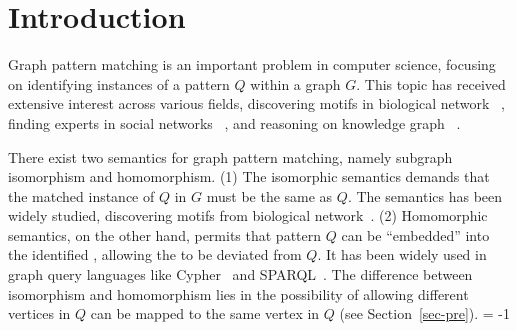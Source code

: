 %
\section{Introduction}
\label{sec-intro}
Graph pattern matching is 
an important problem in computer 
science, focusing on identifying instances of a pattern $Q$ 
within a graph $G$.
This topic has received 
extensive interest across various fields,
\eg 
discovering motifs in biological network
~\cite{chen2019hogmmnc, licheri2021grapes, tian2007saga}, 
finding experts in social networks
~\cite{shi2017multi, fei2013expfinder, brynielsson2010detecting}, 
and reasoning on knowledge graph
~\cite{xu2019cross, teru2020inductive, li2022hismatch}.

There exist two semantics for graph pattern matching, 
namely subgraph isomorphism and homomorphism.
(1) The isomorphic semantics demands that
the matched instance of $Q$  in 
$G$  must be the same as $Q$.
The semantics has been widely studied, 
\eg discovering motifs from biological network~\cite{chen2019hogmmnc, licheri2021grapes, tian2007saga}.
(2) Homomorphic semantics,
on the other hand, permits that 
pattern $Q$ can be ``embedded'' into the 
identified , 
allowing the  
 to be deviated from $Q$.
It has been widely used in graph query languages 
like Cypher~\cite{Cypher} and SPARQL~\cite{SPARQL}.
The difference between isomorphism and homomorphism
lies in the possibility 
of allowing different vertices in $Q$
can be mapped to the same vertex in $Q$ (see Section~\ref{sec-pre}).
\looseness = -1

